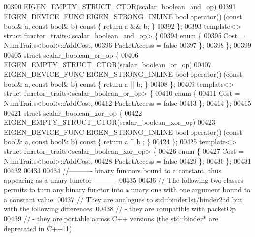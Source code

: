 \begin{DoxyCode}
00390   EIGEN\_EMPTY\_STRUCT\_CTOR(scalar\_boolean\_and\_op)
00391   EIGEN\_DEVICE\_FUNC EIGEN\_STRONG\_INLINE \textcolor{keywordtype}{bool} operator() (\textcolor{keyword}{const} \textcolor{keywordtype}{bool}& a, \textcolor{keyword}{const} \textcolor{keywordtype}{bool}& b)\textcolor{keyword}{ const }\{ \textcolor{keywordflow}{return} a && 
      b; \}
00392 \};
00393 \textcolor{keyword}{template}<> \textcolor{keyword}{struct }functor\_traits<scalar\_boolean\_and\_op> \{
00394   \textcolor{keyword}{enum} \{
00395     Cost = NumTraits<bool>::AddCost,
00396     PacketAccess = \textcolor{keyword}{false}
00397   \};
00398 \};
00399 
00405 \textcolor{keyword}{struct }scalar\_boolean\_or\_op \{
00406   EIGEN\_EMPTY\_STRUCT\_CTOR(scalar\_boolean\_or\_op)
00407   EIGEN\_DEVICE\_FUNC EIGEN\_STRONG\_INLINE \textcolor{keywordtype}{bool} operator() (\textcolor{keyword}{const} \textcolor{keywordtype}{bool}& a, \textcolor{keyword}{const} \textcolor{keywordtype}{bool}& b)\textcolor{keyword}{ const }\{ \textcolor{keywordflow}{return} a || 
      b; \}
00408 \};
00409 \textcolor{keyword}{template}<> \textcolor{keyword}{struct }functor\_traits<scalar\_boolean\_or\_op> \{
00410   \textcolor{keyword}{enum} \{
00411     Cost = NumTraits<bool>::AddCost,
00412     PacketAccess = \textcolor{keyword}{false}
00413   \};
00414 \};
00415 
00421 \textcolor{keyword}{struct }scalar\_boolean\_xor\_op \{
00422   EIGEN\_EMPTY\_STRUCT\_CTOR(scalar\_boolean\_xor\_op)
00423   EIGEN\_DEVICE\_FUNC EIGEN\_STRONG\_INLINE \textcolor{keywordtype}{bool} operator() (\textcolor{keyword}{const} \textcolor{keywordtype}{bool}& a, \textcolor{keyword}{const} \textcolor{keywordtype}{bool}& b)\textcolor{keyword}{ const }\{ \textcolor{keywordflow}{return} a ^ b
      ; \}
00424 \};
00425 \textcolor{keyword}{template}<> \textcolor{keyword}{struct }functor\_traits<scalar\_boolean\_xor\_op> \{
00426   \textcolor{keyword}{enum} \{
00427     Cost = NumTraits<bool>::AddCost,
00428     PacketAccess = \textcolor{keyword}{false}
00429   \};
00430 \};
00431 
00432 
00433 
00434 \textcolor{comment}{//---------- binary functors bound to a constant, thus appearing as a unary functor ----------}
00435 
00436 \textcolor{comment}{// The following two classes permits to turn any binary functor into a unary one with one argument bound to
       a constant value.}
00437 \textcolor{comment}{// They are analogues to std::binder1st/binder2nd but with the following differences:}
00438 \textcolor{comment}{//  - they are compatible with packetOp}
00439 \textcolor{comment}{//  - they are portable across C++ versions (the std::binder* are deprecated in C++11)}

\end{DoxyCode}
